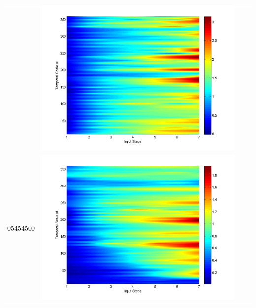 \documentclass[11pt]{article}
\begin{document}
\begin{table}[H]
{\begin{tabular}{c  c   c   c  }
&\begin{minipage}{.3\textwidth}\includegraphics[width=\linewidth]{resultgraph/05418500pepq.png}\end{minipage}
\\
05454500&\begin{minipage}{.3\textwidth}\includegraphics[width=\linewidth]{resultgraph/05454500p.png}\end{minipage}

\end{tabular}}
\end{table}
\end{document}
